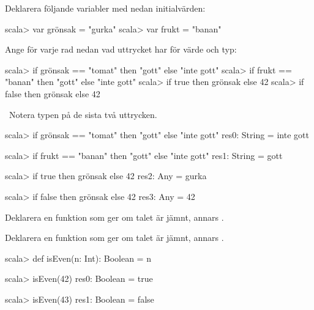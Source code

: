 \QUESTEND





\QUESTBEGIN

\Task  Deklarera följande variabler med nedan initialvärden:

\begin{REPLnonum}
scala> var grönsak = "gurka"
scala> var frukt = "banan"
\end{REPLnonum}

Ange för varje rad nedan vad uttrycket har för värde och typ:
\begin{REPLnonum}
scala> if grönsak == "tomat" then "gott" else "inte gott"
scala> if frukt == "banan" then "gott" else "inte gott"
scala> if true then grönsak else 42
scala> if false then grönsak else 42
\end{REPLnonum}

\SOLUTION


\TaskSolved \what~Notera typen  på de sista två uttrycken.

\begin{REPLnonum}
scala> if grönsak == "tomat" then "gott" else "inte gott"
res0: String = inte gott

scala> if frukt == "banan" then "gott" else "inte gott"
res1: String = gott

scala> if true then grönsak else 42
res2: Any = gurka

scala> if false then grönsak else 42
res3: Any = 42
\end{REPLnonum}


\QUESTEND






\QUESTBEGIN

\Task \what

\Subtask Deklarera en funktion  som ger  om talet  är jämnt, annars .

\Subtask Deklarera en funktion  som ger  om talet  är jämnt, annars .

\SOLUTION


\TaskSolved \what

\SubtaskSolved
\begin{REPL}
scala> def isEven(n: Int): Boolean = n %

scala> isEven(42)
res0: Boolean = true

scala> isEven(43)
res1: Boolean = false

\end{REPL}


